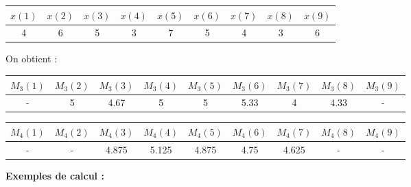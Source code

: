 \begin{center}
\begin{tabular}{|c|c|c|c|c|c|c|c|c|}
\hline
{ \textbf{$x(1)$}} & { \textbf{$x(2)$}} & { \textbf{$x(3)$}} & { \textbf{$x(4)$}} & { \textbf{$x(5)$}} & { \textbf{$x(6)$}} & { \textbf{$x(7)$}} & { \textbf{$x(8)$}} & { \textbf{$x(9)$}} \\ \hline
4                                      & 6                                      & 5                                      & 3                                      & 7                                      & 5                                      & 4                                      & 3                                      & 6                                      \\ \hline
\end{tabular}
\end{center}
On obtient :
\begin{center}
\begin{tabular}{|c|c|c|c|c|c|c|c|c|}
\hline
{ \textbf{$M_{3}(1)$}} & { \textbf{$M_{3}(2)$}} & { \textbf{$M_{3}(3)$}} & { \textbf{$M_{3}(4)$}} & { \textbf{$M_{3}(5)$}} & { \textbf{$M_{3}(6)$}} & { \textbf{$M_{3}(7)$}} & { \textbf{$M_{3}(8)$}} & { \textbf{$M_{3}(9)$}} \\ \hline
-                                          & 5                                          & 4.67                                       & 5                                          & 5                                          & 5.33                                       & 4                                          & 4.33                                       & -                                          \\ \hline
\end{tabular}
\end{center}

\begin{center}
\begin{tabular}{|c|c|c|c|c|c|c|c|c|}
\hline
{ \textbf{$M_{4}(1)$}} & { \textbf{$M_{4}(2)$}} & { \textbf{$M_{4}(3)$}} & { \textbf{$M_{4}(4)$}} & { \textbf{$M_{4}(5)$}} & { \textbf{$M_{4}(6)$}} & { \textbf{$M_{4}(7)$}} & { \textbf{$M_{4}(8)$}} & { \textbf{$M_{4}(9)$}} \\ \hline
- & - & 4.875 & 5.125 & 4.875 & 4.75 & 4.625 & - & - \\ \hline
\end{tabular}
\end{center}
\textbf{Exemples de calcul :}

